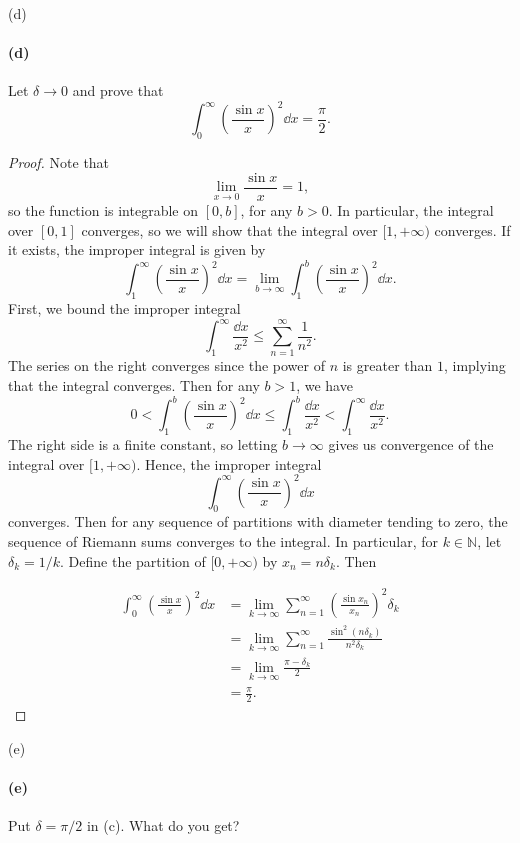 \documentclass[12pt]{article}
\newenvironment{fullbox}{\begin{lrbox}{\savefullbox}\begin{minipage}{\dimexpr\textwidth-2\fboxsep\relax}}{\end{minipage}\end{lrbox}\begin{center}\framebox[\textwidth]{\usebox{\savefullbox}}\end{center}}
\newenvironment{pbox}[1][]{\begin{fullbox}\ifx#1\empty\else\paragraph{#1}\fi}{\end{fullbox}}
\theoremstyle{definition}
\newcommand{\N}{\mathbb{N}}
\newcommand{\pfrac}[2]{\left(\frac{#1}{#2}\right)}
\begin{document}
\newpage
\begin{pbox}[(d)]
    Let $\delta \to 0$ and prove that
    \[
        \int_{0}^{\infty} \pfrac{\sin x}{x}^2 \dd{x} = \frac{\pi}{2}.
    \]
\end{pbox}

\begin{proof}
    Note that
    \[
        \lim_{x \to 0} \frac{\sin x}{x} = 1,
    \]
    so the function is integrable on $[0, b]$, for any $b > 0$. In particular, the integral over $[0, 1]$ converges, so we will show that the integral over $[1, +\infty)$ converges. If it exists, the improper integral is given by
    \[
        \int_{1}^{\infty} \pfrac{\sin x}{x}^2 \dd{x} = \lim_{b \to \infty} \int_{1}^{b} \pfrac{\sin x}{x}^2 \dd{x}.
    \]
    First, we bound the improper integral
    \[
        \int_{1}^{\infty} \frac{\dd{x}}{x^2} \leq \sum_{n=1}^{\infty} \frac{1}{n^2}. 
    \]
    The series on the right converges since the power of $n$ is greater than $1$, implying that the integral converges. Then for any $b > 1$, we have
    \[
        0 < \int_{1}^{b} \pfrac{\sin x}{x}^2 \dd{x} \leq \int_{1}^{b} \frac{\dd{x}}{x^2} < \int_{1}^{\infty} \frac{\dd{x}}{x^2}. 
    \]
    The right side is a finite constant, so letting $b \to \infty$ gives us convergence of the integral over $[1, +\infty)$. Hence, the improper integral
    \[
        \int_{0}^{\infty} \pfrac{\sin x}{x}^2 \dd{x} 
    \]
    converges. Then for any sequence of partitions with diameter tending to zero, the sequence of Riemann sums converges to the integral. In particular, for $k \in \N$, let $\delta_k = 1/k$. Define the partition of $[0, +\infty)$ by $x_n = n\delta_k$. Then

    \begin{align*}
        \int_{0}^{\infty} \pfrac{\sin x}{x}^2 \dd{x}
            &= \lim_{k \to \infty} \sum_{n=1}^{\infty} \pfrac{\sin x_n}{x_n}^2 \delta_k \\
            &= \lim_{k \to \infty} \sum_{n=1}^{\infty} \frac{\sin^2(n\delta_k)}{n^2\delta_k} \\
            &= \lim_{k \to \infty} \frac{\pi - \delta_k}{2} \\
            &= \frac{\pi}{2}.
    \end{align*}


\end{proof}

\begin{pbox}[(e)]
    Put $\delta = \pi/2$ in (c). What do you get?
\end{pbox}
\end{document}
